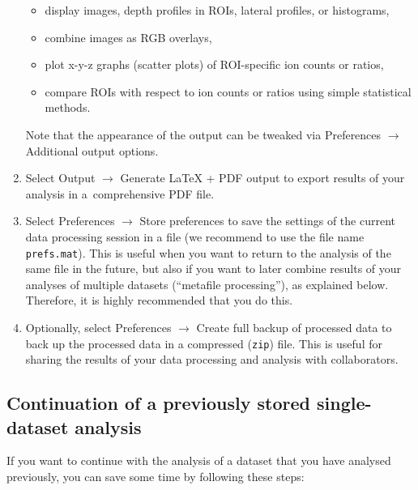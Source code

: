 \documentclass[a4paper, 11pt]{article}
\newcommand{\ttt}[1]{\texttt{#1}}
\newcommand{\lans}[1]{{\color{magenta}#1}}
\newcommand{\lanscb}[1]{{\color{darkgreen}#1}}
\newcommand\ra{\rightarrow}
\newcounter{step}
\begin{document}
\begin{enumerate}
\begin{itemize}
\item display \lanscb{images}, \lanscb{depth profiles in ROIs}, \lanscb{lateral profiles}, or \lanscb{histograms},
\item \lanscb{combine images as RGB} overlays,
\item \lanscb{plot x-y-z graphs} (scatter plots) of ROI-specific ion counts or ratios,  
\item \lanscb{compare ROIs} with respect to ion counts or ratios using simple statistical methods.
\end{itemize}
%
Note that the appearance of the output can be tweaked via \lans{Preferences} $\ra$ \lans{Additional output options}.

\item Select \lans{Output} $\ra$ \lans{Generate LaTeX + PDF output} to export results of your analysis in a~comprehensive PDF file. 

\item Select \lans{Preferences} $\ra$ \lans{Store preferences} to save the settings of the current data processing session in a file (we recommend to use the file name \ttt{prefs.mat}). This is useful when you want to return to the analysis of the same file in the future, but also if you want to later combine results of your analyses of multiple datasets (``metafile processing''), as explained below. Therefore, it is highly recommended that you do this.

\item Optionally, select \lans{Preferences} $\ra$ \lans{Create full backup of processed data} to back up the processed data in a compressed (\ttt{zip}) file. This is useful for sharing the results of your data processing and analysis with collaborators.

\end{enumerate}


\subsection{Continuation of a previously stored single-dataset analysis}

If you want to continue with the analysis of a dataset that you have analysed previously, you can save some time by following these steps:
\end{document}

